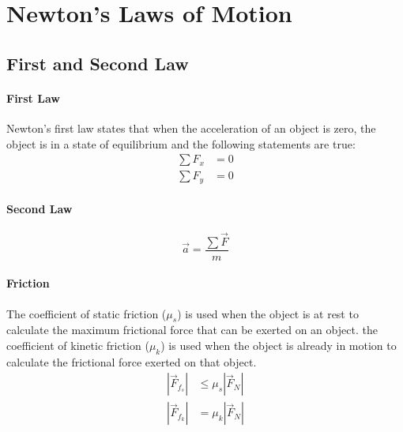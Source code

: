 \documentclass{article}
\begin{document}
    \section{Newton’s Laws of Motion}

        \subsection{First and Second Law}
            \paragraph{First Law}
            Newton's first law states that when the acceleration of an object is zero, the object is in a state of equilibrium and the following statements are true:
            \begin{align}
                \sum F_x &= 0 \nonumber\\
                \sum F_y &= 0 \nonumber
            \end{align}

            \paragraph{Second Law}
            \begin{equation}
                \vec{a} = \frac{\sum \vec{F}}{m}
            \end{equation}

            \paragraph{Friction}
            The coefficient of static friction ($\mu_s$) is used when the object is at rest to calculate the maximum frictional force that can be exerted on an object. the coefficient of kinetic friction ($\mu_k$) is used when the object is already in motion to calculate the frictional force exerted on that object.
            \begin{align}
                \left| \vec{F}_{f_s} \right| &\le \mu_s \left| \vec{F}_N \right| \\
                \left| \vec{F}_{f_k} \right| &= \mu_k \left| \vec{F}_N \right|
            \end{align}
\end{document}
